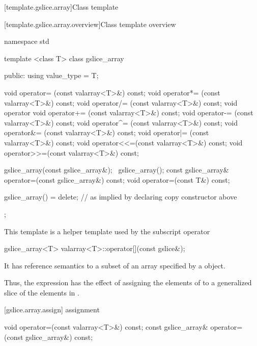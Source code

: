 [template.gslice.array]{Class template }

[template.gslice.array.overview]{Class template  overview}

%
\begin{codeblock}
namespace std {
  template <class T> class gslice_array {
  public:
    using value_type = T;

    void operator=  (const valarray<T>&) const;
    void operator*= (const valarray<T>&) const;
    void operator/= (const valarray<T>&) const;
    void operator%
    void operator+= (const valarray<T>&) const;
    void operator-= (const valarray<T>&) const;
    void operator^= (const valarray<T>&) const;
    void operator&= (const valarray<T>&) const;
    void operator|= (const valarray<T>&) const;
    void operator<<=(const valarray<T>&) const;
    void operator>>=(const valarray<T>&) const;

    gslice_array(const gslice_array&);
    ~gslice_array();
    const gslice_array& operator=(const gslice_array&) const;
    void operator=(const T&) const;

    gslice_array() = delete;      // as implied by declaring copy constructor above
  };
}
\end{codeblock}

\pnum
This template is a helper template used by the
subscript operator

%
%
\begin{itemdecl}
gslice_array<T> valarray<T>::operator[](const gslice&);
\end{itemdecl}

\begin{itemdescr}
\pnum
It has reference semantics to a subset of an array specified by a
object.

\pnum
Thus, the expression
has the effect of assigning the elements of
to a
generalized slice of the elements in
.
\end{itemdescr}

[gslice.array.assign]{ assignment}

%
\begin{itemdecl}
void operator=(const valarray<T>&) const;
const gslice_array& operator=(const gslice_array&) const;
\end{itemdecl}

